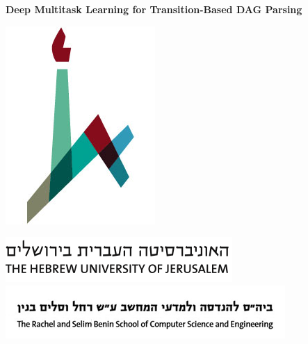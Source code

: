 \documentclass[a0,portrait]{a0poster}
\begin{document}
\begin{center}
	\veryHuge \color{NavyBlue} \textbf{Deep Multitask Learning for Transition-Based DAG Parsing}
\end{center}
\vspace{-1cm}
\begin{minipage}[b]{.07\linewidth}
\includegraphics[width=\linewidth]{huji_logo.jpg}
\vspace{5mm}
\end{minipage}
\begin{minipage}[b]{.16\linewidth}
\includegraphics[width=\linewidth]{huji_banner.png}
\includegraphics[width=\linewidth]{cse_banner.jpg}
\vspace{.8mm}
\end{minipage}
\end{document}
